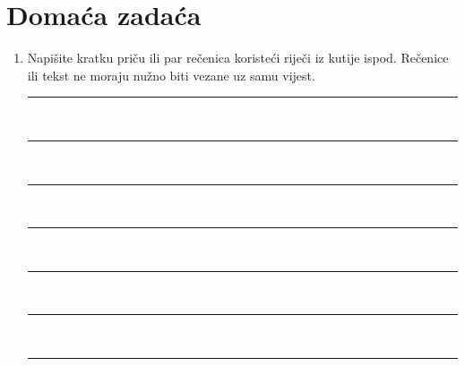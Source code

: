 \documentclass[a5paper, 10pt]{tekst}
\begin{document}
	\clearpage
	
	\section*{Domaća zadaća}
	\begin{enumerate}
		\item Napišite kratku priču ili par rečenica koristeći riječi iz kutije ispod.
		Rečenice ili tekst ne moraju nužno biti vezane uz samu vijest.
		\begin{center}
			\vspace{0.5em}
			\vspace{1.4em}
			\rule{\linewidth}{0.5pt}\\[0.6em]
			\rule{\linewidth}{0.5pt}\\[0.6em]
			\rule{\linewidth}{0.5pt}\\[0.6em]
			\rule{\linewidth}{0.5pt}\\[0.6em]
			\rule{\linewidth}{0.5pt}\\[0.6em]
			\rule{\linewidth}{0.5pt}\\[0.6em]
			\rule{\linewidth}{0.5pt}
		\end{center}
		

\end{enumerate}
\end{document}
